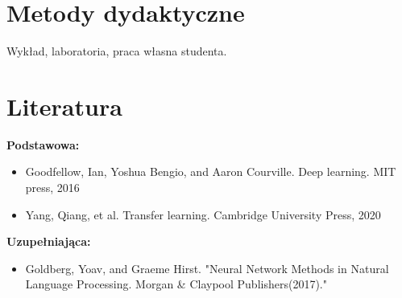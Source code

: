 \documentclass[12pt, a4paper]{article}
\begin{document}
\section{Metody dydaktyczne}

Wykład, laboratoria, praca własna studenta.

\section{Literatura}

\textbf{Podstawowa:}
\begin{itemize}
  \item Goodfellow, Ian, Yoshua Bengio, and Aaron Courville. Deep learning. MIT press, 2016
  \item Yang, Qiang, et al. Transfer learning. Cambridge University Press, 2020
\end{itemize}

\textbf{Uzupełniająca:}
\begin{itemize}
  \item Goldberg, Yoav, and Graeme Hirst. "Neural Network Methods in Natural Language Processing. Morgan \& Claypool Publishers(2017)."
\end{itemize}
\end{document}

